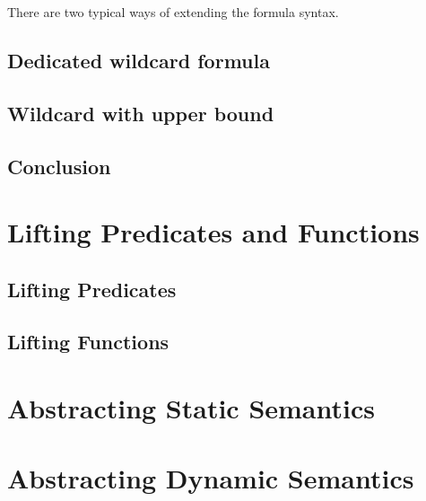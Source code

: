 There are two typical ways of extending the formula syntax.
\subsection{Dedicated wildcard formula}
\label{ssec:dedicated-wildcard-formula}


\subsection{Wildcard with upper bound}
\label{ssec:wildcard-with-upper}



\subsection{Conclusion}
\label{ssec:gfconclusion}



\section{Lifting Predicates and Functions}
\label{sec:lifting-predicates-and}


\subsection{Lifting Predicates}
\label{ssec:lifting-predicates}


\subsection{Lifting Functions}
\label{ssec:lifting-functions}


\section{Abstracting Static Semantics}
\label{sec:abstracting-static-semantics}


\section{Abstracting Dynamic Semantics}

